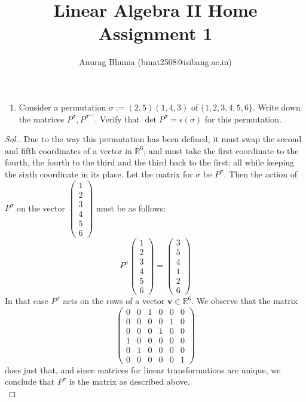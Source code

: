 \documentclass{article}
\title{Linear Algebra II Home Assignment 1}
\author{
\begin{tabular}{c}
Anurag Bhunia (bmat2508@isibang.ac.in)\\[0.6em]
\end{tabular}
}
\date{}
\begin{document}
\maketitle
\begin{enumerate}
\item Consider a permutation $\sigma :=(2,5)(1,4,3)$ of $\{1,2,3,4,5,6\}$. Write down the matrices $P^{\sigma},P^{\sigma^{-1}}$. Verify that $\det{P^{\sigma}}=\epsilon(\sigma)$ for this permutation.
\end{enumerate}
\begin{proof}[Sol.]
Due to the way this permutation has been defined, it must swap the second and fifth coordinates of a vector in $\mathbb{R}^6$, and must take the first coordinate to the fourth, the fourth to the third and the third back to the first; all while keeping the sixth coordinate in its place.
Let the matrix for $\sigma$ be $P^{\sigma}$. Then the action of $P^{\sigma}$ on the vector 
$\begin{pmatrix}
1\\
2\\
3\\
4\\
5\\
6
\end{pmatrix}$ must be as follows:
$$P^{\sigma}
\begin{pmatrix}
1\\
2\\
3\\
4\\
5\\
6
\end{pmatrix}=
\begin{pmatrix}
3\\
5\\
4\\
1\\
2\\
6
\end{pmatrix}
$$
In that case $P^{\sigma}$ acts on the rows of a vector $\mathbf{v}\in\mathbb{R}^6$. We observe that the matrix 
$$
\begin{pmatrix}
0&0&1&0&0&0\\
0&0&0&0&1&0\\
0&0&0&1&0&0\\
1&0&0&0&0&0\\
0&1&0&0&0&0\\
0&0&0&0&0&1
\end{pmatrix}
$$
does just that, and since matrices for linear transformations are unique, we conclude that $P^{\sigma}$ is the matrix as described above.\\

\end{proof}
\end{document}
